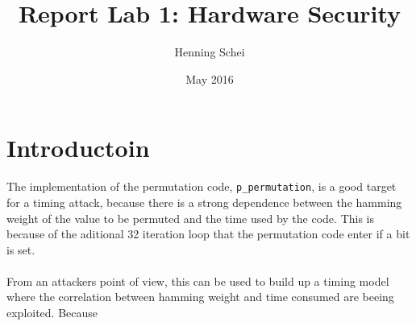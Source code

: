 \documentclass{article}
\title{Report Lab 1: Hardware Security}
\author{Henning Schei}
\date{May 2016}
\begin{document}
\maketitle

\section{Introductoin}
The implementation of the permutation code, \texttt{p\_permutation}, is a good target for a timing attack, because there is a strong dependence between the hamming weight of the value to be permuted and the time used by the code. This is because of the aditional 32 iteration loop that the permutation code enter if a bit is set. \\ \\ From an attackers point of view, this can be used to build up a timing model where the correlation between hamming weight and time consumed are beeing exploited. Because       
\end{document}
